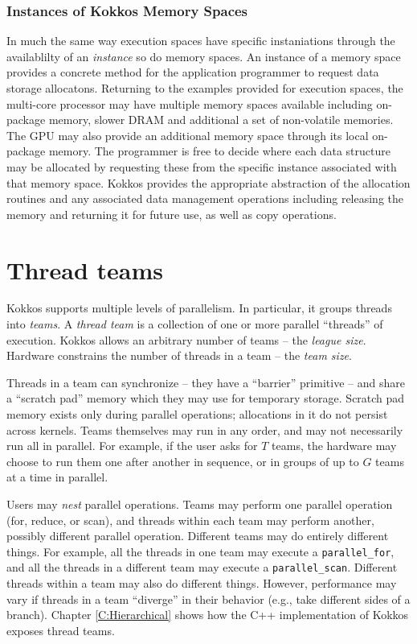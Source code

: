 \subsubsection{Instances of Kokkos Memory Spaces}

In much the same way execution spaces have specific instaniations through
the availablilty of an {\em instance} so do memory spaces. An instance
of a memory space provides a concrete method for the
application programmer to request data storage allocatons. Returning
to the examples provided for execution spaces, the multi-core
processor may have multiple memory spaces available including
on-package memory, slower DRAM and additional a set of non-volatile
memories. The GPU may also provide an additional memory space
through its local on-package memory. The programmer is free
to decide where each data structure may be allocated by requesting
these from the specific instance associated with that memory space.
Kokkos provides the appropriate abstraction of the allocation
routines and any associated data management operations including
releasing the memory and returning it for future use, as well as
copy operations.


\section{Thread teams}\label{S:Model:Teams}

Kokkos supports multiple levels of parallelism.
In particular, it groups threads into \emph{teams}.
A \emph{thread team} is a collection of one or more parallel ``threads'' of execution.
Kokkos allows an arbitrary number of teams -- the \emph{league size}.
Hardware constrains the number of threads in a team -- the \emph{team size}.

Threads in a team can synchronize -- they have a ``barrier'' primitive -- 
and share a ``scratch pad'' memory which they may use for temporary storage.
Scratch pad memory exists only during parallel operations;
allocations in it do not persist across kernels.
Teams themselves may run in any order,
and may not necessarily run all in parallel.
For example, if the user asks for $T$ teams,
the hardware may choose to run them one after another in sequence,
or in groups of up to $G$ teams at a time in parallel.

Users may \emph{nest} parallel operations.
Teams may perform one parallel operation (for, reduce, or scan),
and threads within each team may perform another, possibly different parallel operation.
Different teams may do entirely different things.
For example, all the threads in one team may execute a \lstinline!parallel_for!,
and all the threads in a different team may execute a \lstinline!parallel_scan!.
Different threads within a team may also do different things.
However, performance may vary if threads in a team ``diverge'' in their behavior
(e.g., take different sides of a branch).
Chapter \ref{C:Hierarchical} shows how the C++ implementation of Kokkos exposes thread teams.

